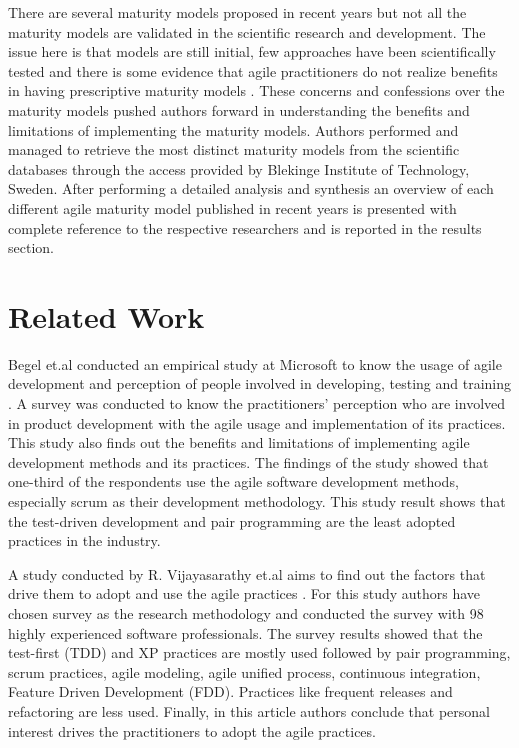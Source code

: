\documentclass[a4paper,oneside]{bth}
\begin{document}
There are several maturity models proposed in recent years but not all the maturity models are validated in the scientific research and development. The issue here is that models are still initial, few approaches have been scientifically tested and there is some evidence that agile practitioners do not realize benefits in having prescriptive maturity models \cite{fontana_maturing_2014}. These concerns and confessions over the maturity models pushed authors forward in understanding the benefits and limitations of implementing the maturity models. Authors performed and managed to retrieve the most distinct maturity models from the scientific databases through the access provided by Blekinge Institute of Technology, Sweden. After performing a detailed analysis and synthesis an overview of each different agile maturity model published in recent years is presented with complete reference to the respective researchers and is reported in the results section.
\section{Related Work}

Begel et.al conducted an empirical study at Microsoft to know the usage of agile development and perception of people involved in developing, testing and training \cite{begel_usage_2007}. A survey was conducted to know the practitioners’ perception who are involved in product development with the agile usage and implementation of its practices. This study also finds out the benefits and limitations of implementing agile development methods and its practices. The findings of the study showed that one-third of the respondents use the agile software development methods, especially scrum as their development methodology. This study result shows that the test-driven development and pair programming are the least adopted practices in the industry.

A study conducted by R. Vijayasarathy et.al aims to find out the factors that drive them to adopt and use the agile practices \cite{vijayasarathy_agile_2008}. For this study authors have chosen survey as the research methodology and conducted the survey with 98 highly experienced software professionals. The survey results showed that the test-first (TDD) and XP practices are mostly used followed by pair programming, scrum practices, agile modeling, agile unified process, continuous integration, Feature Driven Development (FDD). Practices like frequent releases and refactoring are less used. Finally, in this article authors conclude that personal interest drives the practitioners to adopt the agile practices.
\end{document}
